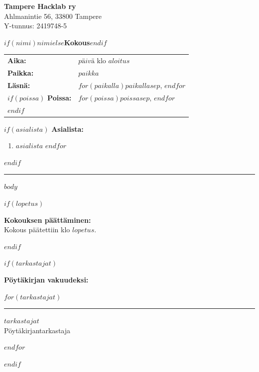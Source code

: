 \documentclass[11pt, a4paper]{article}
\begin{document}
\noindent
\textbf{Tampere Hacklab ry} \\
Ahlmanintie 56, 33800 Tampere \\
Y-tunnus: 2419748-5

\vspace{0.5cm}

\begin{center}
    {\LARGE \textbf{$if(nimi)$$nimi$$else$Kokous$endif$}}
\end{center}
\vspace{0.5cm}

\noindent
\begin{tabular}{@{}p{3cm} p{12cm}}
\textbf{Aika:} & $päivä$ klo $aloitus$ \\
\textbf{Paikka:} & $paikka$ \\
\textbf{Läsnä:} & $for(paikalla)$$paikalla$$sep$, $endfor$ \\
$if(poissa)$
\textbf{Poissa:} & $for(poissa)$$poissa$$sep$, $endfor$ \\
$endif$
\end{tabular}

\vspace{0.5cm}

$if(asialista)$
\noindent\textbf{Asialista:}
\begin{enumerate}
$for(asialista)$
  \item $asialista$
$endfor$
\end{enumerate}
\vspace{0.5cm}
$endif$

\hrule
\vspace{0.5cm}

$body$

$if(lopetus)$
\vspace{1cm}
\begin{samepage} %
\noindent \textbf{Kokouksen päättäminen:} \\
Kokous päätettiin klo $lopetus$.
\end{samepage}
$endif$

$if(tarkastajat)$
\vspace{1cm}
\begin{samepage} %
\noindent\textbf{Pöytäkirjan vakuudeksi:}

\vspace{0.5cm}
\noindent
$for(tarkastajat)$
\begin{minipage}[t]{7cm}
\vspace{1.5cm}
\hrule
\vspace{0.2cm}
$tarkastajat$\\
Pöytäkirjantarkastaja
\end{minipage}
\hspace{1cm}
$endfor$
\end{samepage}
$endif$
\end{document}
